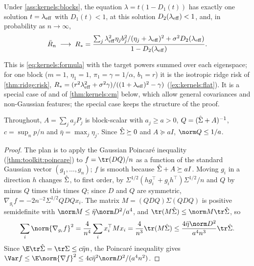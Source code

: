 \begin{refsection}
\begin{theorem}\label{thm:kernels:main}
Under \cref{ass:kernels:blocks}, the equation $\lambda=t(1-D_1(t))$ has exactly one solution $t=\lambda_{\mathrm{eff}}$ with $D_1(t)<1$, at this solution $D_2(\lambda_{\mathrm{eff}})<1$, and, in probability as $n\to\infty$,
\[
\bar R_n\;\longrightarrow\;R_*=\frac{\sum_j\lambda_{\mathrm{eff}}^2\eta_jb_j^2/(\eta_j+\lambda_{\mathrm{eff}})^2+\sigma^2D_2(\lambda_{\mathrm{eff}})}{1-D_2(\lambda_{\mathrm{eff}})}.
\]
\end{theorem}

This is \eqref{eq:kernels:formula} with the target powers summed over each eigenspace; for one block ($m=1$, $\eta_1=1$, $\pi_1=\gamma=1/\alpha$, $b_1=r$) it is the isotropic ridge risk of \cref{thm:ridge:risk}, $R_*=(r^2\lambda_{\mathrm{eff}}^2+\sigma^2\gamma)/((1+\lambda_{\mathrm{eff}})^2-\gamma)$ (\cref{ex:kernels:flat}). It is a special case of \textcite[Theorems~5--6 of arXiv version~5]{HastieEtAl2022} and of \cref{thm:kernels:cm} below, which allow general covariances and non-Gaussian features; the special case keeps the structure of the proof.

Throughout, $A=\sum_ja_jP_j$ is block-scalar with $a_j\ge a>0$, $Q=(\hat\Sigma+A)^{-1}$, $c=\sup_np/n$ and $\bar\eta=\max_j\eta_j$. Since $\hat\Sigma\succeq0$ and $A\succeq aI$, $\norm Q\le1/a$.


\begin{proof}
The plan is to apply the Gaussian Poincaré inequality (\cref{thm:toolkit:poincare}) to $f=\tr(DQ)/n$ as a function of the standard Gaussian vector $(g_1,\dots,g_n)$; $f$ is smooth because $\hat\Sigma+A\succeq aI$. Moving $g_i$ in a direction $h$ changes $\hat\Sigma$, to first order, by $\Sigma^{1/2}(hg_i^\top+g_ih^\top)\Sigma^{1/2}/n$ and $Q$ by minus $Q$ times this times $Q$; since $D$ and $Q$ are symmetric, $\nabla_{g_i}f=-2n^{-2}\Sigma^{1/2}QDQx_i$. The matrix $M=(QDQ)\Sigma(QDQ)$ is positive semidefinite with $\norm M\le\bar\eta\norm D^2/a^4$, and $\tr(M\kernelsSh)\le\norm M\tr\kernelsSh$, so
\[
\sum_i\norm{\nabla_{g_i}f}^2=\frac4{n^4}\sum_ix_i^\top Mx_i=\frac4{n^3}\tr(M\kernelsSh)\le\frac{4\bar\eta\norm D^2}{a^4n^3}\tr\kernelsSh .
\]
Since $\E\tr\kernelsSh=\tr\Sigma\le c\bar\eta n$, the Poincaré inequality gives $\Var f\le\E\norm{\nabla f}^2\le4c\bar\eta^2\norm D^2/(a^4n^2)$.
\end{proof}


\end{refsection}
